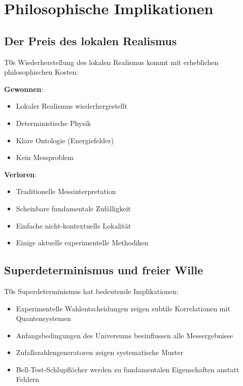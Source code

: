 \documentclass[12pt,a4paper]{article}
\begin{document}
	\section{Philosophische Implikationen}
	
	\subsection{Der Preis des lokalen Realismus}
	
	T0s Wiederherstellung des lokalen Realismus kommt mit erheblichen philosophischen Kosten:
	
	\begin{tcolorbox}[colback=purple!5!white,colframe=purple!75!black,title=Philosophische Abwägungen]
		\textbf{Gewonnen}:
		\begin{itemize}
			\item Lokaler Realismus wiederhergestellt
			\item Deterministische Physik
			\item Klare Ontologie (Energiefelder)
			\item Kein Messproblem
		\end{itemize}
		
		\textbf{Verloren}:
		\begin{itemize}
			\item Traditionelle Messinterpretation
			\item Scheinbare fundamentale Zufälligkeit
			\item Einfache nicht-kontextuelle Lokalität
			\item Einige aktuelle experimentelle Methodiken
		\end{itemize}
	\end{tcolorbox}
	
	\subsection{Superdeterminismus und freier Wille}
	
	T0s Superdeterminismus hat bedeutende Implikationen:
	
	\begin{itemize}
		\item Experimentelle Wahlentscheidungen zeigen subtile Korrelationen mit Quantensystemen
		\item Anfangsbedingungen des Universums beeinflussen alle Messergebnisse
		\item Zufallszahlengeneratoren zeigen systematische Muster
		\item Bell-Test-Schlupflöcher werden zu fundamentalen Eigenschaften anstatt Fehlern
	\end{itemize}
	
\end{document}
